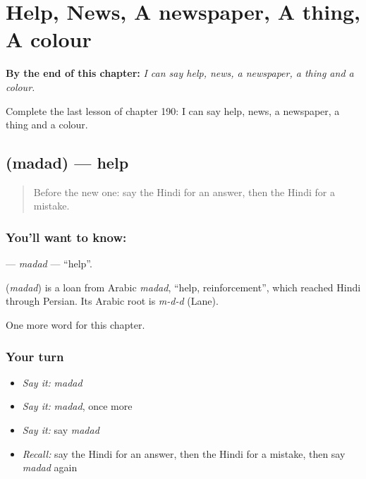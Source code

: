 
\chapter{Help, News, A newspaper, A thing, A colour}
\label{ch:hi-help-news-a-newspaper-a-thing-a-colour}

\begin{chapteropening}
\textbf{By the end of this chapter:} \emph{I can say help, news, a newspaper, a thing and a colour.}

Complete the last lesson of chapter 190: I can say help, news, a newspaper, a thing and a colour.
\end{chapteropening}

\section[\texorpdfstring{\hi{मदद} (madad)}{मदद (madad)}]{ (madad) — help}

\label{lesson:HI-C190-madad}



\begin{quote}
Before the new one: say the Hindi for an answer, then the Hindi for a mistake.
\end{quote}

\subsection*{You'll want to know: }
\textbf{} — \emph{madad} — \textquotedblleft{}help\textquotedblright{}.

\begin{cousinweb}
\textbf{} (\emph{madad}) is a loan from Arabic \emph{madad}, \textquotedblleft{}help, reinforcement\textquotedblright{}, which reached Hindi through Persian. Its Arabic root is \emph{m-d-d} (Lane).
\end{cousinweb}

\begin{grammarlens}[title={What you've built}]
One more word for this chapter.
\end{grammarlens}

\subsection*{Your turn}
\begin{itemize}
\raggedright
  \item \emph{Say it:} \emph{madad}
  \item \emph{Say it:} \emph{madad}, once more
  \item \emph{Say it:} say \emph{madad}
  \item \emph{Recall:} say the Hindi for an answer, then the Hindi for a mistake, then say \emph{madad} again
\end{itemize}


